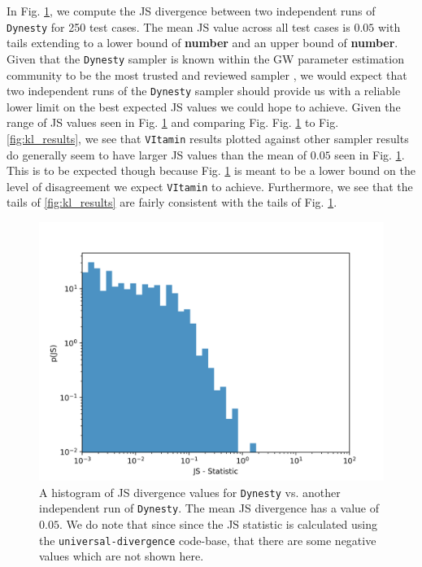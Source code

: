 %
%
In Fig. \ref{fig:dyn_vs_dyn_ful14D_JS}, we compute the \ac{JS} divergence 
between two independent runs of \texttt{Dynesty} for 250 test cases. The mean 
\ac{JS} value across all test cases is $0.05$ with tails extending 
to a lower bound of \textbf{number} and an upper bound of \textbf{number}. 
Given that the \texttt{Dynesty} 
sampler is known within the \ac{GW} parameter estimation community to be the most trusted and
reviewed sampler \cite{}, we would expect that two independent runs of 
the \texttt{Dynesty} sampler should provide us with a reliable lower limit 
on the best expected \ac{JS} values we could hope to achieve. Given the range 
of \ac{JS} values seen in Fig. \ref{fig:dyn_vs_dyn_ful14D_JS} and comparing 
Fig. Fig. \ref{fig:dyn_vs_dyn_ful14D_JS} to Fig. \ref{fig:kl_results}, we see that 
\texttt{VItamin} results plotted against other sampler results do generally seem 
to have larger \ac{JS} values than the mean of $0.05$ seen in Fig. \ref{fig:dyn_vs_dyn_ful14D_JS}.
This is to be expected though because Fig. \ref{fig:dyn_vs_dyn_ful14D_JS} is 
meant to be a lower bound on the level of disagreement we expect \texttt{VItamin} 
to achieve. Furthermore, we see that the tails of \ref{fig:kl_results} are fairly 
consistent with the tails of Fig. \ref{fig:dyn_vs_dyn_ful14D_JS}. 

%
%

%
%

\begin{figure}
    \includegraphics[width=\columnwidth]{figures/dynesty-dynesty_fullJS.png}
    \caption[\texttt{Dynesty} vs. \texttt{Dynesty} full 14-D \ac{JS} divergence histogram plot.]{\label{fig:dyn_vs_dyn_ful14D_JS} A histogram of \ac{JS} divergence values for \texttt{Dynesty} vs. another independent run of \texttt{Dynesty}. The mean \ac{JS} divergence has a value of $0.05$. We do note that since since the JS statistic is calculated using the \texttt{universal-divergence} code-base, that there are some negative values which are not shown here.}
\end{figure}

